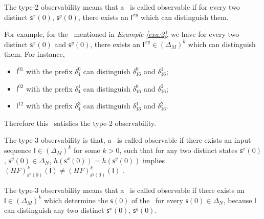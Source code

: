 The type-2 observability means that a \BCN\ is called observable if for every two distinct $\mathsf{s}^{x}(0)$, $\mathsf{s}^{y}(0)$, there exists an $\mathsf{I}^{xy}$ which can distinguish them. %
\begin{example}
For example, for the \BCN\ mentioned in {\em Example \ref{exa:2}}, we have for every two distinct $\mathsf{s}^{x}(0)$ and $\mathsf{s}^{y}(0)$, there exists an $\mathsf{I}^{xy}\in(\Delta_M)^k$ which can distinguish them.  For instance,
\begin{itemize}
  \item $\mathsf{I}^{01}$ with the prefix $\delta_{4}^0$ can distinguish $\delta_{16}^0$ and $\delta_{16}^1$;
  \item $\mathsf{I}^{02}$ with the prefix $\delta_{4}^1$ can distinguish $\delta_{16}^0$ and $\delta_{16}^2$;
  \item $\mathsf{I}^{12}$ with the prefix $\delta_{4}^3$ can distinguish $\delta_{16}^1$ and $\delta_{16}^2$.
\end{itemize} 
Therefore this \BCN\ satisfies the type-2 observability.
\label{exa:5}
\end{example}   
\begin{definition}
The type-3 observability is that, a \BCN\ is called observable if there exists an input sequence $\mathsf{I}\in(\Delta_M)^k$ for some $k>0$, such that for any two distinct states $\mathsf{s}^{x}(0)$, $\mathsf{s}^{y}(0) \in \Delta_N$, $h(\mathsf{s}^{x}(0))=h(\mathsf{s}^{y}(0))$ implies $(HF)^k_{\mathsf{s}^{x}(0)}(\mathsf{I})\neq (HF)^k_{\mathsf{s}^{y}(0)}(\mathsf{I})$ \cite{Cheng2011Identification}.
\end{definition}

The type-3 observability means that a \BCN\ is called observable if there exists an $\mathsf{I}\in(\Delta_M)^k$ which determine the $\mathsf{s}(0)$ of the \BCN\ for every $\mathsf{s}(0)\in\Delta_N$, because $\mathsf{I}$ can distinguish any two distinct $\mathsf{s}^{x}(0)$, $\mathsf{s}^{y}(0)$.%

